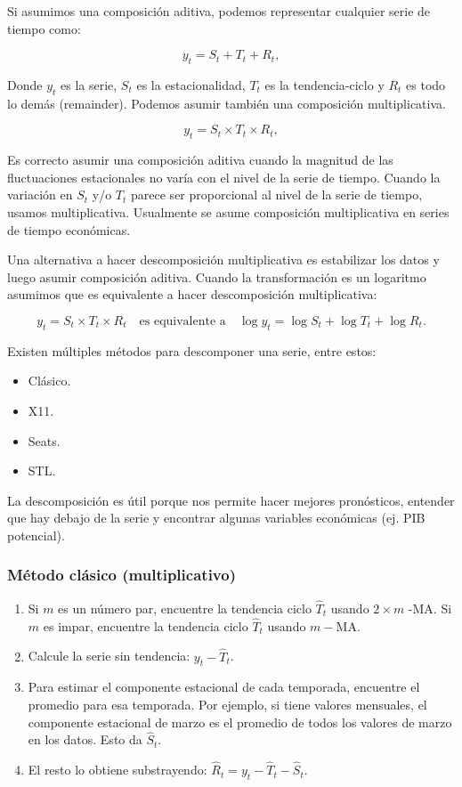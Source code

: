\documentclass[
]{article}
\providecommand{\tightlist}{%
  \setlength{\itemsep}{0pt}\setlength{\parskip}{0pt}}
\begin{document}
Si asumimos una composición aditiva, podemos representar cualquier serie
de tiempo como:

\[y_{t} = S_{t} + T_{t} + R_t,\]

Donde \(y_t\) es la serie, \(S_t\) es la estacionalidad, \(T_t\) es la
tendencia-ciclo y \(R_t\) es todo lo demás (remainder). Podemos asumir
también una composición multiplicativa.

\[y_{t} = S_{t} \times T_{t} \times R_t,\]

Es correcto asumir una composición aditiva cuando la magnitud de las
fluctuaciones estacionales no varía con el nivel de la serie de tiempo.
Cuando la variación en \(S_{t}\) y/o \(T_{t}\) parece ser proporcional
al nivel de la serie de tiempo, usamos multiplicativa. Usualmente se
asume composición multiplicativa en series de tiempo económicas.

Una alternativa a hacer descomposición multiplicativa es estabilizar los
datos y luego asumir composición aditiva. Cuando la transformación es un
logaritmo asumimos que es equivalente a hacer descomposición
multiplicativa:

\[y_{t} = S_{t} \times T_{t} \times R_t \quad\text{es equivalente a}\quad
  \log y_{t} = \log S_{t} + \log T_{t} + \log R_t.\]

Existen múltiples métodos para descomponer una serie, entre estos:

\begin{itemize}
\tightlist
\item
  Clásico.
\item
  X11.
\item
  Seats.
\item
  STL.
\end{itemize}

La descomposición es útil porque nos permite hacer mejores pronósticos,
entender que hay debajo de la serie y encontrar algunas variables
económicas (ej. PIB potencial).

\hypertarget{muxe9todo-cluxe1sico-multiplicativo}{%
\subsubsection{Método clásico
(multiplicativo)}\label{muxe9todo-cluxe1sico-multiplicativo}}

\begin{enumerate}
\def\labelenumi{\arabic{enumi}.}
\item
  Si \(m\) es un número par, encuentre la tendencia ciclo
  \(\hat{T}_{t}\) usando \(2 \times m\) -MA. Si \(m\) es impar,
  encuentre la tendencia ciclo \(\hat{T}_{t}\) usando \(m-\mathrm{MA}\).
\item
  Calcule la serie sin tendencia: \(y_t - \hat{T}_t\).
\item
  Para estimar el componente estacional de cada temporada, encuentre el
  promedio para esa temporada. Por ejemplo, si tiene valores mensuales,
  el componente estacional de marzo es el promedio de todos los valores
  de marzo en los datos. Esto da \(\hat{S}_t\).
\item
  El resto lo obtiene substrayendo:
  \(\hat{R}_t = y_t - \hat{T}_t - \hat{S}_t\).
\end{enumerate}
\end{document}
